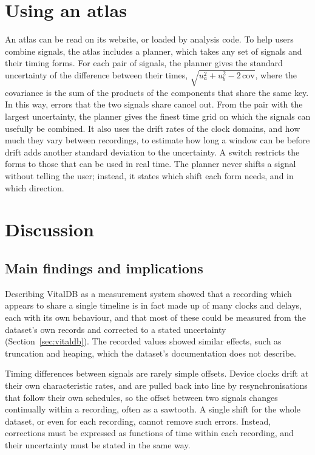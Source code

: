 \documentclass[11pt,a4paper]{article}
\begin{document}
\section{Using an atlas}
\label{sec:use}

An atlas can be read on its website, or loaded by analysis code. To help users combine signals, the atlas includes a
planner, which takes any set of signals and their timing forms. For each pair of signals, the planner gives the
standard uncertainty of the difference between their times, $\sqrt{u_a^2 + u_b^2 - 2\,\mathrm{cov}}$, where the
covariance is the sum of the products of the components that share the same key. In this way, errors that the two
signals share cancel out. From the pair with the largest uncertainty, the planner gives the finest time grid on which
the signals can usefully be combined. It also uses the drift rates of the clock domains, and how much they vary
between recordings, to estimate how long a window can be before drift adds another standard deviation to the
uncertainty. A switch restricts the forms to those that can be used in real time. The planner never shifts a signal
without telling the user; instead, it states which shift each form needs, and in which direction.

\section{Discussion}
\label{sec:limits}

\subsection{Main findings and implications}

Describing VitalDB as a measurement system showed that a recording which appears to share a single timeline is in fact
made up of many clocks and delays, each with its own behaviour, and that most of these could be measured from the
dataset's own records and corrected to a stated uncertainty (Section~\ref{sec:vitaldb}). The recorded values showed
similar effects, such as truncation and heaping, which the dataset's documentation does not describe.

Timing differences between signals are rarely simple offsets. Device clocks drift at their own characteristic rates,
and are pulled back into line by resynchronisations that follow their own schedules, so the offset between two
signals changes continually within a recording, often as a sawtooth. A single shift for the whole dataset, or even
for each recording, cannot remove such errors. Instead, corrections must be expressed as functions of time within
each recording, and their uncertainty must be stated in the same way.
\end{document}
